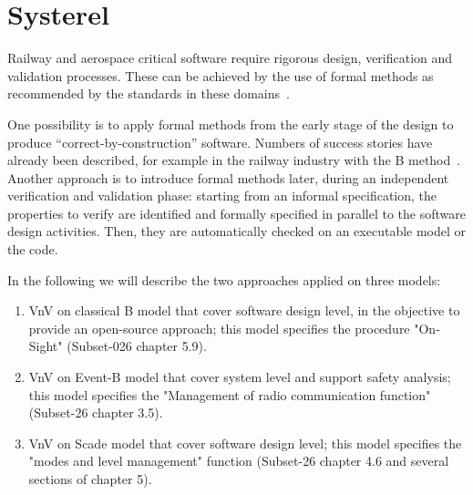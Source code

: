 \documentclass{template/openetcs_article}
\begin{document}










\let\paragraph\oldparagraph
\let\paragraph\oldsubparagraph


\section{Systerel}
\label{sec:systerel}

Railway and aerospace critical software require rigorous design, verification and validation processes. These can be achieved by the use of formal  methods as recommended by  the standards in these domains~\cite{standard_railway_2011,standard_aerospace_2011}.

One possibility is to apply formal methods from the early stage of the design to produce ``correct-by-construction'' software. Numbers of success stories have already been described, for example in the railway industry with the B method~\cite{behm1999meteor,DBLP:conf/zum/BadeauA05,essame2006b}. Another approach is to introduce formal  methods later, during an independent verification and validation phase: starting from an informal specification, the properties to verify are identified and formally  specified in parallel to the software design activities. Then, they are automatically checked on an executable model or the code.

In the following we will describe the two approaches applied on three models:

\begin{enumerate}
\item VnV on classical B  model that cover software design level, in the objective to provide an open-source approach; this model specifies the procedure "On-Sight" (Subset-026 chapter 5.9).
\item VnV on Event-B model that cover system level and support safety analysis; this model specifies the "Management of radio communication function" (Subset-26 chapter 3.5).
\item VnV on Scade model that cover software design level; this model specifies the "modes and level management" function (Subset-26 chapter 4.6 and several sections of chapter 5).
\end{enumerate}
\end{document}
